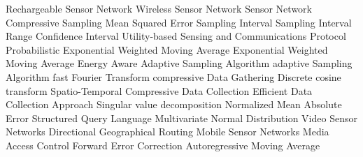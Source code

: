 \begin{acronym}[YTM]
   {Rechargeable Sensor Network}
   {Wireless Sensor Network}
    {Sensor Network}
    {Compressive Sampling}
   {Mean Squared Error}
    {Sampling Interval}
   {Sampling Interval Range}
    {Confidence Interval}
  {Utility-based Sensing and Communications Protocol}
 {Probabilistic Exponential Weighted Moving Average}
  {Exponential Weighted Moving Average}
  {Energy Aware Adaptive Sampling Algorithm}
   {adaptive Sampling Algorithm}
   {fast Fourier Transform}
   {compressive Data Gathering}
   {Discrete cosine transform}
 {Spatio-Temporal Compressive Data Collection}
  {Efficient Data Collection Approach}
   {Singular value decomposition}
  {Normalized Mean Absolute Error}
   {Structured Query Language}
   {Multivariate Normal Distribution}
   {Video Sensor Networks}
   {Directional Geographical Routing}
   {Mobile Sensor Networks}
   {Media Access Control}
   {Forward Error Correction}
  {Autoregressive Moving Average}
\end{acronym}